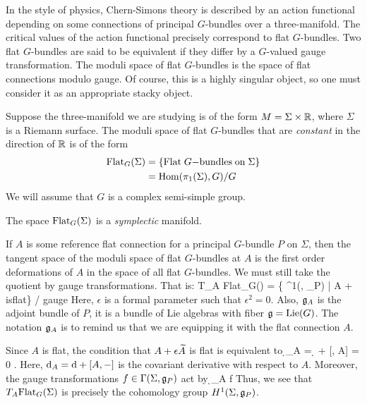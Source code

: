 \documentclass[10pt]{amsart}
\begin{document}
In the style of physics, Chern-Simons theory is described by an action functional depending on some connections of principal $G$-bundles over a three-manifold. 
The critical values of the action functional precisely correspond to flat $G$-bundles. 
Two flat $G$-bundles are said to be equivalent if they differ by a $G$-valued gauge transformation. 
The moduli space of flat $G$-bundles is the space of flat connections modulo gauge. 
Of course, this is a highly singular object, so one must consider it as an appropriate stacky object. 

Suppose the three-manifold we are studying is of the form $M = \Sigma \times \RR$, where $\Sigma$ is a Riemann surface. 
The moduli space of flat $G$-bundles that are {\em constant} in the direction of $\RR$ is of the form
\begin{align*}
{\rm Flat}_G(\Sigma) & = \{{\rm Flat \; }G{\rm -bundles\;on\;}\Sigma\} \\ & = {\rm Hom}(\pi_1(\Sigma), G) / G
\end{align*}
We will assume that $G$ is a complex semi-simple group.

\begin{fact}
The space ${\rm Flat}_G(\Sigma)$ is a {\em symplectic} manifold. 
\end{fact} 

If $A$ is some reference flat connection for a principal $G$-bundle $P$ on $\Sigma$, then the tangent space of the moduli space of flat $G$-bundles at $A$ is the first order deformations of $A$ in the space of all flat $G$-bundles. 
We must still take the quotient by gauge transformations. 
That is:
\ben
T_A {\rm Flat}_G(\Sigma) = \{ \in \Omega^1(\Sigma , \fg_P) \; | \; A + \epsilon {} {\rm \; is\;flat}\} / {\rm gauge}
\een
Here, $\epsilon$ is a formal parameter such that $\epsilon^2 = 0$. 
Also, $\fg_A$ is the adjoint bundle of $P$, it is a bundle of Lie algebras with fiber $\fg = {\rm Lie}(G)$. 
The notation $\fg_A$ is to remind us that we are equipping it with the flat connection $A$. 

Since $A$ is flat, the condition that $A + \epsilon \Tilde{A}$ is flat is equivalent to 
\ben
\d_A  = \d {} + [, A] = 0 .
\een 
Here, $\d_A = \d + [A,-]$ is the covariant derivative with respect to $A$. 
Moreover, the gauge transformations $f \in \Gamma(\Sigma, \fg_P)$ act by
\ben
{} \mapsto \d_A f
\een
Thus, we see that $T_A{\rm Flat}_G(\Sigma)$ is precisely the cohomology group $H^1(\Sigma, \fg_P)$. 
\end{document}
